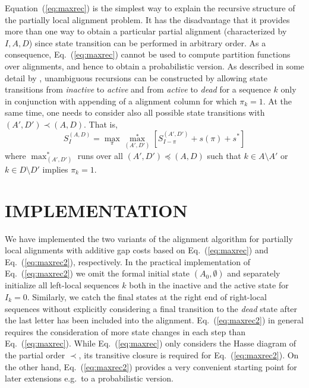 \documentclass[a4paper,10pt]{article}
\begin{document}
Equation~(\ref{eq:maxrec}) is the simplest way to explain the recursive
structure of the partially local alignment problem. It has the disadvantage
that it provides more than one way to obtain a particular partial alignment
(characterized by $I,A,D$) since state transition can be performed in
arbitrary order. As a consequence, Eq.~(\ref{eq:maxrec}) cannot be used to
compute partition functions over alignments, and hence to obtain a
probabilistic version. As described in some detail by \citet{Retzlaff:18a},
unambiguous recursions can be constructed by allowing state transitions
from \textit{inactive} to \textit{active} and from \textit{active} to
\textit{dead} for a sequence $k$ only in conjunction with appending of a
alignment column for which $\pi_k=1$.  At the same time, one needs to
consider also all possible state transitions with $(A',D')\prec(A,D)$. That
is,
\begin{equation}
  S^{(A,D)}_I = 
  \displaystyle\max_{\pi} \displaystyle\max_{(A',D')}^*
  \left[ S^{(A',D')}_{I-\pi} + s(\pi) + s^* \right]
  \label{eq:maxrec2}
\end{equation}
where $\max_{(A',D')}^*$ runs over all $(A',D')\preceq(A,D)$ such that
$k\in A\setminus A'$ or $k\in D\setminus D'$ implies $\pi_k=1$.

\section{\uppercase{Implementation}}

We have implemented the two variants of the alignment algorithm for
partially local alignments with additive gap costs based on
Eq.~(\ref{eq:maxrec}) and Eq.~(\ref{eq:maxrec2}), respectively. In
the practical implementation of Eq.~(\ref{eq:maxrec2}) we omit the formal
initial state $(A_0,\emptyset)$ and separately initialize all left-local
sequences $k$ both in the inactive and the active state for
$I_k=0$. Similarly, we catch the final states at the right end of
right-local sequences without explicitly considering a final transition to
the \textit{dead} state after the last letter has been included into the
alignment. Eq.~(\ref{eq:maxrec2}) in general requires the consideration of
more state changes in each step than Eq.~(\ref{eq:maxrec}). While
Eq.~(\ref{eq:maxrec}) only considers the Hasse diagram of the partial order
$\prec$, its transitive closure is required for Eq.~(\ref{eq:maxrec2}). On
the other hand, Eq.~(\ref{eq:maxrec2}) provides a very convenient starting
point for later extensions e.g.\ to a probabilistic version.
\end{document}

